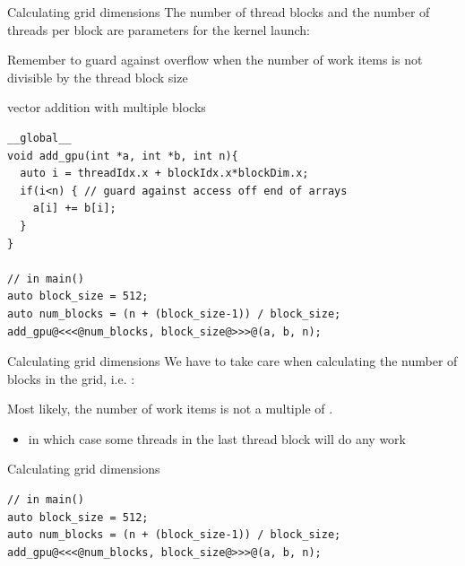 \begin{frame}[fragile]{}
    \begin{info}{Calculating grid dimensions}
            The number of thread blocks and the number of threads per block are parameters for the kernel launch:
            \begin{center}
            \end{center}
            Remember to guard against overflow when the number of work items is not divisible by the thread block size
    \end{info}

    \begin{code}{vector addition with multiple blocks}
        \begin{lstlisting}[style=boxcudatiny]
__global__
void add_gpu(int *a, int *b, int n){
  auto i = threadIdx.x + blockIdx.x*blockDim.x;
  if(i<n) { // guard against access off end of arrays
    a[i] += b[i];
  }
}

// in main()
auto block_size = 512;
auto num_blocks = (n + (block_size-1)) / block_size;
add_gpu@<<<@num_blocks, block_size@>>>@(a, b, n);
        \end{lstlisting}
    \end{code}
\end{frame}

\begin{frame}[fragile]{}
    \begin{info}{Calculating grid dimensions}
        We have to take care when calculating the number of blocks in the grid, i.e. :
        \begin{center}
        \end{center}
        Most likely, the number of work items  is not a multiple of .
        \begin{itemize}
            \item in which case some threads in the last thread block will do any work
        \end{itemize}
    \end{info}

    \begin{code}{Calculating grid dimensions}
        \begin{lstlisting}[style=boxcudatiny]
// in main()
auto block_size = 512;
auto num_blocks = (n + (block_size-1)) / block_size;
add_gpu@<<<@num_blocks, block_size@>>>@(a, b, n);
        \end{lstlisting}
    \end{code}
\end{frame}

